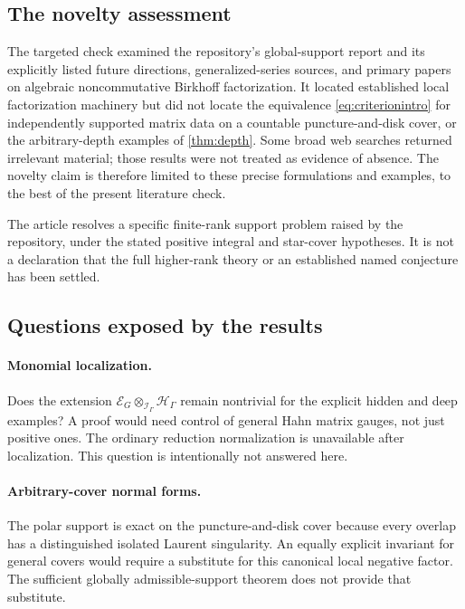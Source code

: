 \documentclass[11pt,letterpaper]{article}
\theoremstyle{definition}
\theoremstyle{remark}
\newcommand{\HH}{\mathscr H_\Gamma}
\newcommand{\II}{\mathscr I_\Gamma}
\numberwithin{equation}{section}
\begin{document}
\subsection{The novelty assessment}

The targeted check examined the repository's global-support report and its explicitly listed future directions, generalized-series sources, and primary papers on algebraic noncommutative Birkhoff factorization. It located established local factorization machinery but did not locate the equivalence \eqref{eq:criterionintro} for independently supported matrix data on a countable puncture-and-disk cover, or the arbitrary-depth examples of \cref{thm:depth}. Some broad web searches returned irrelevant material; those results were not treated as evidence of absence. The novelty claim is therefore limited to these precise formulations and examples, to the best of the present literature check.

The article resolves a specific finite-rank support problem raised by the repository, under the stated positive integral and star-cover hypotheses. It is not a declaration that the full higher-rank theory or an established named conjecture has been settled.

\subsection{Questions exposed by the results}

\paragraph{Monomial localization.}
Does the extension $\mathcal E_G\otimes_{\II}\HH$ remain nontrivial for the explicit hidden and deep examples? A proof would need control of general Hahn matrix gauges, not just positive ones. The ordinary reduction normalization is unavailable after localization. This question is intentionally not answered here.

\paragraph{Arbitrary-cover normal forms.}
The polar support is exact on the puncture-and-disk cover because every overlap has a distinguished isolated Laurent singularity. An equally explicit invariant for general covers would require a substitute for this canonical local negative factor. The sufficient globally admissible-support theorem does not provide that substitute.
\end{document}
